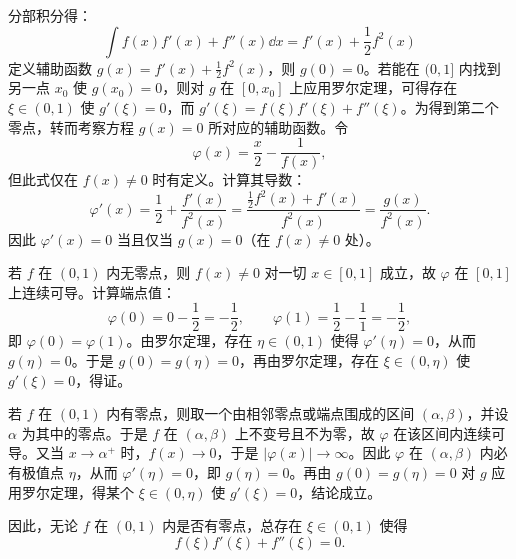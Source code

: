 \begin{solution}
分部积分得：
\[
\int f(x)f'(x)+f''(x) \dd x=  f'(x) + \frac{1}{2}f^2(x)
\]
定义辅助函数 $g(x)=f'(x)+\frac{1}{2}f^2(x)$，则 $g(0)=0$。若能在 $(0,1]$ 内找到另一点 $x_0$ 使 $g(x_0)=0$，则对 $g$ 在 $[0,x_0]$ 上应用罗尔定理，可得存在 $\xi\in(0,1)$ 使 $g'(\xi)=0$，而 $g'(\xi)=f(\xi)f'(\xi)+f''(\xi)$。为得到第二个零点，转而考察方程 $g(x)=0$ 所对应的辅助函数。令
\[
\varphi(x)=\frac{x}{2}-\frac{1}{f(x)},
\]
但此式仅在 $f(x)\neq0$ 时有定义。计算其导数：
\[
\varphi'(x)=\frac{1}{2}+\frac{f'(x)}{f^2(x)}=\frac{\frac{1}{2}f^2(x)+f'(x)}{f^2(x)}=\frac{g(x)}{f^2(x)}.
\]
因此 $\varphi'(x)=0$ 当且仅当 $g(x)=0$（在 $f(x)\neq0$ 处）。

若 $f$ 在 $(0,1)$ 内无零点，则 $f(x)\neq0$ 对一切 $x\in[0,1]$ 成立，故 $\varphi$ 在 $[0,1]$ 上连续可导。计算端点值：
\[
\varphi(0)=0-\frac{1}{2}=-\frac{1}{2},\qquad \varphi(1)=\frac{1}{2}-\frac{1}{1}=-\frac{1}{2},
\]
即 $\varphi(0)=\varphi(1)$。由罗尔定理，存在 $\eta\in(0,1)$ 使得 $\varphi'(\eta)=0$，从而 $g(\eta)=0$。于是 $g(0)=g(\eta)=0$，再由罗尔定理，存在 $\xi\in(0,\eta)$ 使 $g'(\xi)=0$，得证。

若 $f$ 在 $(0,1)$ 内有零点，则取一个由相邻零点或端点围成的区间 $(\alpha,\beta)$，并设 $\alpha$ 为其中的零点。于是 $f$ 在 $(\alpha,\beta)$ 上不变号且不为零，故 $\varphi$ 在该区间内连续可导。又当 $x\to\alpha^+$ 时，$f(x)\to0$，于是 $|\varphi(x)|\to\infty$。因此 $\varphi$ 在 $(\alpha,\beta)$ 内必有极值点 $\eta$，从而 $\varphi'(\eta)=0$，即 $g(\eta)=0$。再由 $g(0)=g(\eta)=0$ 对 $g$ 应用罗尔定理，得某个 $\xi\in(0,\eta)$ 使 $g'(\xi)=0$，结论成立。

因此，无论 $f$ 在 $(0,1)$ 内是否有零点，总存在 $\xi\in(0,1)$ 使得
\[
f(\xi)f'(\xi)+f''(\xi)=0.
\]
\end{solution}
\newpage

